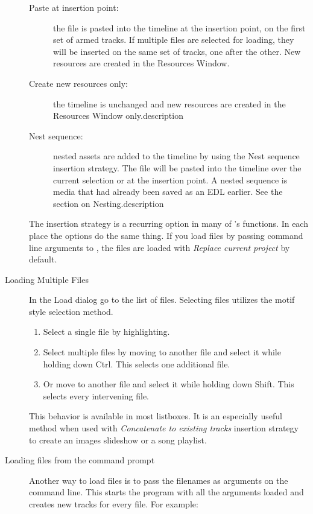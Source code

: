 \begin{description}
\begin{description}
        \item[Paste at insertion point:] the file is pasted into the timeline at the insertion point, on the first set of armed tracks.  If multiple files are selected for loading, they will be inserted on the same set of tracks, one after the other. New resources are created in the Resources Window.
        \item[Create new resources only:] the timeline is unchanged and new resources are created in the Resources Window only.description
        \item[Nest sequence:] nested assets are added to the timeline by using the Nest sequence insertion strategy.
        The file will be pasted into the timeline over the current selection or at the insertion point. A nested sequence is media that had already been saved as an EDL earlier.  See the section on Nesting.description
    \end{description}
    The insertion strategy is a recurring option in many of \CGG{}'s functions. In each place the options do the same thing. If you load files by passing command line arguments to \CGG{}, the files are loaded with \textit{Replace current project} by default.
    \item[Loading Multiple Files] In the Load dialog go to the list of files. Selecting files utilizes the motif style selection method.
    \begin{enumerate} [noitemsep]
        \item Select a single file by highlighting.
        \item Select multiple files by moving to another file and select it while holding down Ctrl. This selects
        one additional file.
        \item Or move to another file and select it while holding down Shift. This selects every intervening file.
    \end{enumerate}
This behavior is available in most listboxes.   It is an especially useful method when used with \textit{Concatenate to existing tracks} insertion strategy to create an images slideshow or a song playlist.
    \item[Loading files from the command prompt] Another way to load files is to pass the filenames as arguments on the command line.  This starts the program with all the arguments loaded and creates new tracks for every file.  For example:
    

\end{description}
